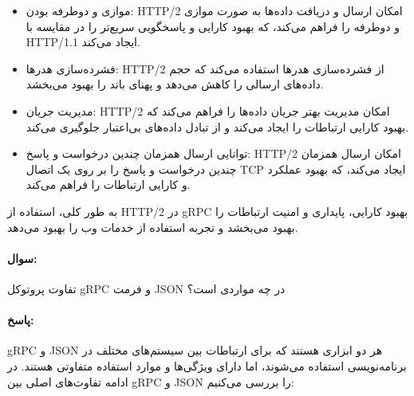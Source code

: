 \documentclass[a4paper,10pt]{article}
\begin{document}
    \begin{itemize}
        
        \item موازی و دوطرفه بودن: HTTP/2 امکان ارسال و دریافت داده‌ها به صورت موازی و دوطرفه را فراهم می‌کند، که بهبود کارایی و پاسخگویی سریع‌تر را در مقایسه با HTTP/1.1 ایجاد می‌کند.

        \item فشرده‌سازی هدرها: HTTP/2 از فشرده‌سازی هدرها استفاده می‌کند که حجم داده‌های ارسالی را کاهش می‌دهد و پهنای باند را بهبود می‌بخشد.

        \item مدیریت جریان: HTTP/2 امکان مدیریت بهتر جریان داده‌ها را فراهم می‌کند که بهبود کارایی ارتباطات را ایجاد می‌کند و از تبادل داده‌های بی‌اعتبار جلوگیری می‌کند.

        \item توانایی ارسال همزمان چندین درخواست و پاسخ: HTTP/2 امکان ارسال همزمان چندین درخواست و پاسخ را بر روی یک اتصال TCP ایجاد می‌کند، که بهبود عملکرد و کارایی ارتباطات را فراهم می‌کند.

    \end{itemize}

    به طور کلی، استفاده از HTTP/2 در gRPC بهبود کارایی، پایداری و امنیت ارتباطات را بهبود می‌بخشد و تجربه استفاده از خدمات وب را بهبود می‌دهد.

    \noindent\hrulefill

    \paragraph{سوال:} تفاوت پروتوکل gRPC و فرمت JSON در چه مواردی است؟

    \paragraph{پاسخ:} gRPC و JSON هر دو ابزاری هستند که برای ارتباطات بین سیستم‌های مختلف در برنامه‌نویسی استفاده می‌شوند، اما دارای ویژگی‌ها و موارد استفاده متفاوتی هستند. در ادامه تفاوت‌های اصلی بین gRPC و JSON را بررسی می‌کنیم:
\end{document}
